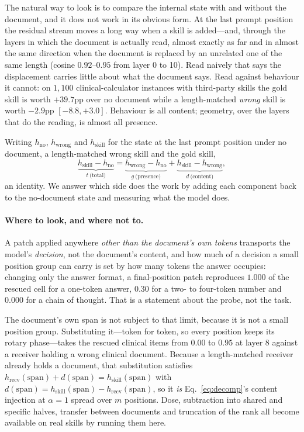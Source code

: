 \documentclass{article}
\newcommand{\dvec}{\ensuremath{d}}
\newcommand{\gvec}{\ensuremath{g}}
\newcommand{\tvec}{\ensuremath{t}}
\begin{document}
The natural way to look is to compare the internal state with and without the
document, and it does not work in its obvious form. At the last prompt position
the residual stream moves a long way when a skill is added---and, through the
layers in which the document is actually read, almost exactly as far and in
almost the same direction when the document is replaced by an unrelated one of
the same length (cosine $0.92$--$0.95$ from layer 0 to 10). Read naively that
says the displacement carries little about what the document says. Read against
behaviour it cannot: on $1{,}100$ clinical-calculator instances with third-party
skills the gold skill is worth $+39.7$pp over no document while a length-matched
\emph{wrong} skill is worth $-2.9$pp $[-8.8, +3.0]$. Behaviour is all content;
geometry, over the layers that do the reading, is almost all presence.

Writing $h_{\text{no}}$, $h_{\text{wrong}}$ and $h_{\text{skill}}$ for the state
at the last prompt position under no document, a length-matched wrong skill and
the gold skill,
\begin{equation}
\underbrace{h_{\text{skill}} - h_{\text{no}}}_{\tvec\ \text{(total)}}
=
\underbrace{h_{\text{wrong}} - h_{\text{no}}}_{\gvec\ \text{(presence)}}
+
\underbrace{h_{\text{skill}} - h_{\text{wrong}}}_{\dvec\ \text{(content)}} ,
\label{eq:decomp}
\end{equation}
an identity. We answer which side does the work by adding each component back to
the no-document state and measuring what the model does.

\paragraph{Where to look, and where not to.} A patch applied anywhere
\emph{other than the document's own tokens} transports the model's
\emph{decision}, not the document's content, and how much of a decision a small
position group can carry is set by how many tokens the answer occupies: changing
only the answer format, a final-position patch reproduces $1.000$ of the rescued
cell for a one-token answer, $0.30$ for a two- to four-token number and $0.000$
for a chain of thought. That is a statement about the probe, not the task.

The document's own span is not subject to that limit, because it is not a small
position group. Substituting it---token for token, so every position keeps its
rotary phase---takes the rescued clinical items from $0.00$ to $0.95$ at layer
$8$ against a receiver holding a wrong clinical document. Because a
length-matched receiver already holds a document, that substitution satisfies
$h_{\text{recv}}(\text{span}) + \dvec(\text{span}) = h_{\text{skill}}(\text{span})$
with $\dvec(\text{span}) = h_{\text{skill}}(\text{span}) -
h_{\text{recv}}(\text{span})$, so it \emph{is} Eq.~\ref{eq:decomp}'s content
injection at $\alpha = 1$ spread over $m$ positions. Dose, subtraction into
shared and specific halves, transfer between documents and truncation of the
rank all become available on real skills by running them here.
\end{document}
